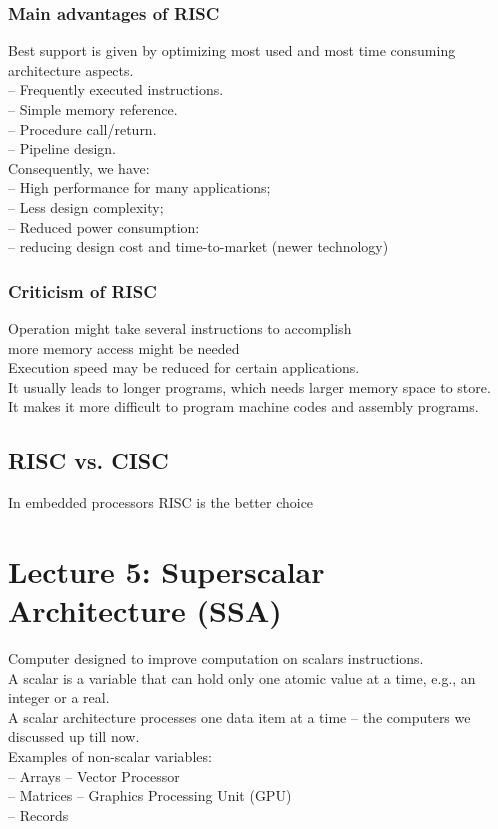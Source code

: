 \documentclass[titlepage, a4paper]{article}
\begin{document}
\subsubsection{Main advantages of RISC}
Best support is given by optimizing most used and most time consuming architecture aspects.\\
-- Frequently executed instructions. \\
-- Simple memory reference. \\
-- Procedure call/return. \\
-- Pipeline design. \\
Consequently, we have: \\
-- High performance for many applications;  \\
-- Less design complexity; \\
-- Reduced power consumption: \\
-- reducing design cost and time-to-market (newer technology) \\

\subsubsection{Criticism of RISC}
Operation might take several instructions to accomplish \\
more memory access might be needed \\
Execution speed may be reduced for certain applications. \\

It usually leads to longer programs, which needs larger memory space to store. \\
It makes it more difficult to program machine codes and assembly programs. \\

\subsection{RISC vs. CISC}
In embedded processors RISC is the better choice

\section{Lecture 5: Superscalar Architecture (SSA)}
Computer designed to improve computation on scalars instructions. \\
A scalar is a variable that can hold only one atomic value at a time, e.g., an integer or a real. \\
A scalar architecture processes one data item at a time -- the computers we discussed up till now. \\
Examples of non-scalar variables: \\
-- Arrays -- Vector Processor \\
-- Matrices -- Graphics Processing Unit (GPU) \\
-- Records \\
\end{document}

